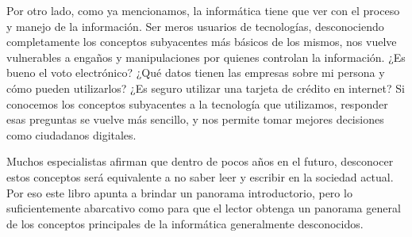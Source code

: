 Por otro lado, como ya mencionamos, la informática tiene que ver con el proceso
y manejo de la información. Ser meros usuarios de tecnologías, desconociendo
completamente los conceptos subyacentes más básicos de los mismos, nos vuelve
vulnerables a engaños y manipulaciones por quienes controlan la información.
¿Es bueno el voto electrónico? ¿Qué datos tienen las empresas sobre mi persona
y cómo pueden utilizarlos? ¿Es seguro utilizar una tarjeta de crédito en internet?
Si conocemos los conceptos subyacentes a la tecnología que utilizamos, responder
esas preguntas se vuelve más sencillo, y nos permite tomar mejores decisiones
como ciudadanos digitales.

Muchos especialistas afirman que dentro de pocos años en el futuro, desconocer
estos conceptos será equivalente a no saber leer y escribir en la sociedad
actual. Por eso este libro apunta a brindar un panorama introductorio, pero
lo suficientemente abarcativo como para que el lector obtenga un panorama
general de los conceptos principales de la informática generalmente
desconocidos.
